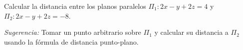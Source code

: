 Calcular la distancia entre los planos paralelos $\Pi_1: 2x - y + 2z = 4$ y $\Pi_2: 2x - y + 2z = -8$.

\textit{Sugerencia:} Tomar un punto arbitrario sobre $\Pi_1$ y calcular su distancia a $\Pi_2$ usando la fórmula de distancia punto-plano.